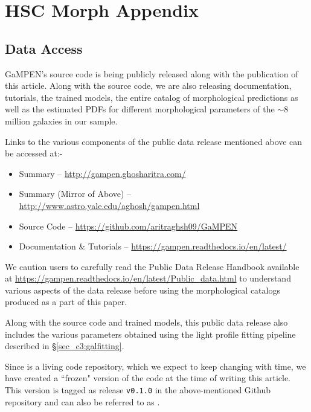 \chapter*{HSC Morph Appendix}\label{ch:hsc_morph_appendix}

\section{Data Access}\label{sec_c3:ap:data_access}

GaMPEN's source code is being publicly released along with the publication of this article. Along with the source code, we are also releasing documentation, tutorials, the trained models, the entire catalog of morphological predictions as well as the estimated PDFs for different morphological parameters of the $\sim8$ million galaxies in our sample. 

\vspace{10pt}
Links to the various components of the public data release mentioned above can be accessed at:-
\begin{itemize}
    \item Summary -- \href{http://gampen.ghosharitra.com/}{\url{http://gampen.ghosharitra.com/}}
    \item Summary (Mirror of Above) --\href{http://www.astro.yale.edu/aghosh/gampen.html}{\url{http://www.astro.yale.edu/aghosh/gampen.html}}
    \item Source Code --
    \href{https://github.com/aritraghsh09/GaMPEN}{\url{https://github.com/aritraghsh09/GaMPEN}}
    \item Documentation \& Tutorials -- 
    \href{https://gampen.readthedocs.io/en/latest/}{\url{https://gampen.readthedocs.io/en/latest/}}
\end{itemize}

We caution users to carefully read the Public Data Release Handbook available at \href{https://gampen.readthedocs.io/en/latest/Public_data.html}{\url{https://gampen.readthedocs.io/en/latest/Public_data.html}} to understand various aspects of the data release before using the morphological catalogs produced as a part of this paper. 

Along with the source code and trained models, this public data release also includes the various parameters obtained using the light profile fitting pipeline described in \S \ref{sec_c3:galfitting}.

Since \gampen{} is a living code repository, which we expect to keep changing with time, we have created a ``frozen" version of the code at the time of writing this article. This version is tagged as release \texttt{v0.1.0} in the above-mentioned Github repository and can also be referred to as \citet{gampen_first_release}.

